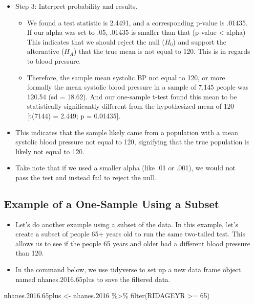 \documentclass[
  letterpaper,
  DIV=11,
  numbers=noendperiod]{scrreprt}
\newenvironment{Shaded}{\begin{snugshade}}{\end{snugshade}}
\newcommand{\DecValTok}[1]{\textcolor[rgb]{0.68,0.00,0.00}{#1}}
\newcommand{\FloatTok}[1]{\textcolor[rgb]{0.68,0.00,0.00}{#1}}
\newcommand{\FunctionTok}[1]{\textcolor[rgb]{0.28,0.35,0.67}{#1}}
\newcommand{\NormalTok}[1]{\textcolor[rgb]{0.00,0.23,0.31}{#1}}
\newcommand{\OtherTok}[1]{\textcolor[rgb]{0.00,0.23,0.31}{#1}}
\newcommand{\SpecialCharTok}[1]{\textcolor[rgb]{0.37,0.37,0.37}{#1}}
\providecommand{\tightlist}{%
  \setlength{\itemsep}{0pt}\setlength{\parskip}{0pt}}\usepackage{longtable,booktabs,array}
\begin{document}
\begin{itemize}
\item
  Step 3: Interpret probability and results.

  \begin{itemize}
  \tightlist
  \item
    We found a test statistic is 2.4491, and a corresponding p-value is
    .01435. If our alpha was set to .05, .01435 is smaller than that
    (p-value \textless{} alpha) This indicates that we should reject the
    null (\(H_0\)) and support the alternative (\(H_A\)) that the true
    mean is not equal to 120. This is in regards to blood pressure.
  \item
    Therefore, the sample mean systolic BP not equal to 120, or more
    formally the mean systolic blood pressure in a sample of 7,145
    people was 120.54 (sd = 18.62). And our one-sample t-test found this
    mean to be statistically significantly different from the
    hypothesized mean of 120 {[}t(7144) = 2.449; p = 0.01435{]}.
  \end{itemize}
\item
  This indicates that the sample likely came from a population with a
  mean systolic blood pressure not equal to 120, signifying that the
  true population is likely not equal to 120.
\item
  Take note that if we used a smaller alpha (like .01 or .001), we would
  not pass the test and instead fail to reject the null.
\end{itemize}

\subsection{Example of a One-Sample Using a
Subset}\label{example-of-a-one-sample-using-a-subset}

\begin{itemize}
\tightlist
\item
  Let's do another example using a subset of the data. In this example,
  let's create a subset of people 65+ years old to run the same
  two-tailed test. This allows us to see if the people 65 years and
  older had a different blood pressure than 120.
\item
  In the command below, we use tidyverse to set up a new data frame
  object named nhanes.2016.65plus to save the filtered data.\\
\end{itemize}

\begin{Shaded}
\begin{Highlighting}[]
\NormalTok{nhanes.}\FloatTok{2016.65}\NormalTok{plus }\OtherTok{\textless{}{-}}\NormalTok{ nhanes}\FloatTok{.2016} \SpecialCharTok{\%\textgreater{}\%}
    \FunctionTok{filter}\NormalTok{(RIDAGEYR }\SpecialCharTok{\textgreater{}=} \DecValTok{65}\NormalTok{)}
\end{Highlighting}
\end{Shaded}
\end{document}
